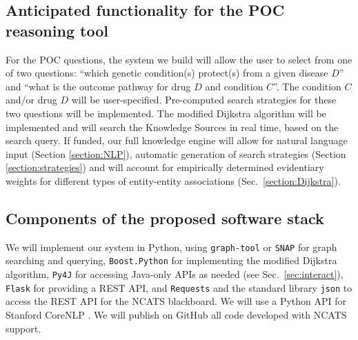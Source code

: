\documentclass[11pt,notitlepage]{article}
\begin{document}
\vspace{-2ex}
\subsection{Anticipated functionality for the POC reasoning tool}
For the POC questions, the system we build will allow the user
to select from one of two questions: ``which genetic condition(s) protect(s)
from a given disease $D$'' and ``what is the outcome pathway for drug $D$ and
condition $C$''. The condition $C$ and/or drug $D$ will be
user-specified. Pre-computed search strategies for these two questions will be
implemented.  The modified Dijkstra algorithm will be implemented and will
search the Knowledge Sources in real time, based on the search query.  If funded, our full knowledge engine 
will allow for natural language input (Section
\ref{section:NLP}), automatic generation of search strategies (Section
\ref{section:strategies}) and will account for empirically determined
evidentiary weights for different types of entity-entity associations
(Sec.~\ref{section:Dijkstra}).%

\vspace{-2ex}
\subsection{Components of the proposed software stack}
We will implement our system in Python, using \verb|graph-tool| \cite{peixoto_graph-tool_2014} or \verb|SNAP| \cite{leskovec2016snap} for
graph searching and querying, \verb|Boost.Python| \cite{boostpython} for implementing the
modified Dijkstra algorithm, \verb|Py4J| \cite{Py4J} for accessing Java-only
APIs as needed (see Sec.~\ref{sec:interact}), \verb|Flask| \cite{grinberg2014flask} for providing a REST
API, and \verb|Requests| and the standard library \verb|json| to access the REST API for the NCATS
blackboard. We will use a Python API for Stanford CoreNLP \cite{manning2014stanford}.  We will publish on GitHub all
code developed with NCATS support.

\end{document}

